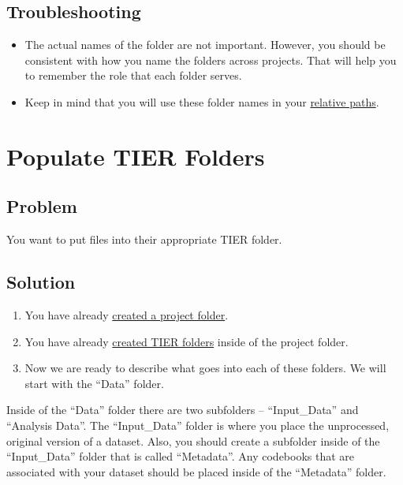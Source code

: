 \documentclass[
]{book}
\providecommand{\tightlist}{%
  \setlength{\itemsep}{0pt}\setlength{\parskip}{0pt}}
\begin{document}
\hypertarget{troubleshooting-9}{%
\subsection{Troubleshooting}\label{troubleshooting-9}}

\begin{itemize}
\tightlist
\item
  The actual names of the folder are not important. However, you should be consistent with how you name the folders across projects. That will help you to remember the role that each folder serves.
\item
  Keep in mind that you will use these folder names in your \protect\hyperlink{relative-path}{relative paths}.
\end{itemize}

\hypertarget{tierpopulate}{%
\section{Populate TIER Folders}\label{tierpopulate}}

\hypertarget{problem-12}{%
\subsection{Problem}\label{problem-12}}

You want to put files into their appropriate TIER folder.

\hypertarget{solution-12}{%
\subsection{Solution}\label{solution-12}}

\begin{enumerate}
\def\labelenumi{\arabic{enumi}.}
\tightlist
\item
  You have already \protect\hyperlink{project}{created a project folder}.
\item
  You have already \protect\hyperlink{tiercreate}{created TIER folders} inside of the project folder.
\item
  Now we are ready to describe what goes into each of these folders. We will start with the ``Data'' folder.
\end{enumerate}

Inside of the ``Data'' folder there are two subfolders -- ``Input\_Data'' and ``Analysis Data''. The ``Input\_Data'' folder is where you place the unprocessed, original version of a dataset. Also, you should create a subfolder inside of the ``Input\_Data'' folder that is called ``Metadata''. Any codebooks that are associated with your dataset should be placed inside of the ``Metadata'' folder.
\end{document}
